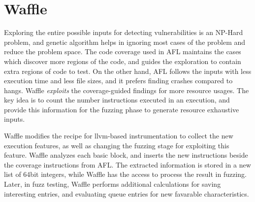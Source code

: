 \section{Waffle}
\label{sec:3-instr}




Exploring the entire possible inputs for detecting vulnerabilities is an NP-Hard problem, and genetic algorithm helps in ignoring most cases of the problem and reduce the problem space. The code coverage used in AFL maintains the cases which discover more regions of the code, and guides the exploration to contain extra regions of code to test. On the other hand, AFL follows the inputs with less execution time and less file sizes, and it prefers finding crashes compared to hangs. Waffle \textit{exploits} the coverage-guided findings for more resource usages. The key idea is to count the number instructions executed in an execution, and provide this information for the fuzzing phase to generate resource exhaustive inputs. 


Waffle modifies the recipe for llvm-based instrumentation to collect the new execution features, as well as changing the fuzzing stage for exploiting this feature. Waffle analyzes each basic block, and inserts the new instructions beside the coverage instructions from AFL. The extracted information is stored in a new list of 64bit integers, while Waffle has the access to process the result in fuzzing. Later, in fuzz testing, Waffle performs additional calculations for saving interesting entries, and evaluating queue entries for new favarable characteristics. 

